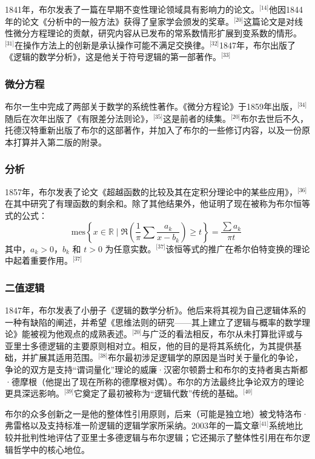 1841年，布尔发表了一篇在早期不变性理论领域具有影响力的论文。\(^\text{[14]}\)他因1844年的论文《分析中的一般方法》获得了皇家学会颁发的奖章。\(^\text{[20]}\)这篇论文是对线性微分方程理论的贡献，研究内容从已发布的常系数情形扩展到变系数的情形。\(^\text{[31]}\)在操作方法上的创新是承认操作可能不满足交换律。\(^\text{[32]}\)1847年，布尔出版了《逻辑的数学分析》，这是他关于符号逻辑的第一部著作。\(^\text{[33]}\)
\subsubsection{微分方程}  
布尔一生中完成了两部关于数学的系统性著作。《微分方程论》于1859年出版，\(^\text{[34]}\)随后在次年出版了《有限差分法则论》，\(^\text{[35]}\)这是前者的续集。\(^\text{[20]}\)布尔去世后不久，托德汉特重新出版了布尔的这部著作，并加入了布尔的一些修订内容，以及一份原本打算并入第二版的附录。
\subsubsection{分析}  
1857年，布尔发表了论文《超越函数的比较及其在定积分理论中的某些应用》，\(^\text{[36]}\)在其中研究了有理函数的剩余和。除了其他结果外，他证明了现在被称为布尔恒等式的公式：
\[
\mathrm{mes} \left\{ x \in \mathbb{R} \mid \Re \left( \frac{1}{\pi} \sum \frac{a_k}{x - b_k} \right) \geq t \right\} = \frac{\sum a_k}{\pi t}~
\]
其中，\( a_k > 0 \)，\( b_k \) 和 \( t > 0 \) 为任意实数。\(^\text{[37]}\)该恒等式的推广在希尔伯特变换的理论中起着重要作用。\(^\text{[37]}\)
\subsubsection{二值逻辑}  
1847年，布尔发表了小册子《逻辑的数学分析》。他后来将其视为自己逻辑体系的一种有缺陷的阐述，并希望《思维法则的研究——其上建立了逻辑与概率的数学理论》能被视为他观点的成熟表述。\(^\text{[20]}\)与广泛的看法相反，布尔从未打算批评或与亚里士多德逻辑的主要原则相对立。相反，他的目的是将其系统化，为其提供基础，并扩展其适用范围。\(^\text{[38]}\)布尔最初涉足逻辑学的原因是当时关于量化的争论，争论的双方是支持“谓词量化”理论的威廉·汉密尔顿爵士和布尔的支持者奥古斯都·德摩根（他提出了现在所称的德摩根对偶）。布尔的方法最终比争论双方的理论更具深远影响。\(^\text{[39]}\)它奠定了最初被称为“逻辑代数”传统的基础。\(^\text{[40]}\)

布尔的众多创新之一是他的整体性引用原则，后来（可能是独立地）被戈特洛布·弗雷格以及支持标准一阶逻辑的逻辑学家所采纳。2003年的一篇文章\(^\text{[41]}\)系统地比较并批判性地评估了亚里士多德逻辑与布尔逻辑；它还揭示了整体性引用在布尔逻辑哲学中的核心地位。

